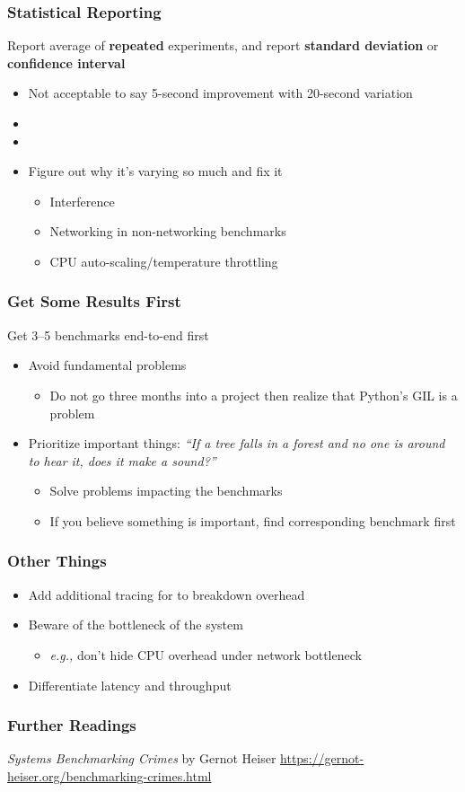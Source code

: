 \documentclass[xcolor={dvipsnames},aspectratio=149]{beamer}
\def\eg{\emph{e.g.,}\xspace}
\begin{document}
\begin{frame}
  \frametitle{Statistical Reporting}
  Report average of \textbf{repeated} experiments, and report \textbf{standard deviation} or
  \textbf{confidence interval}
  \begin{itemize}
  \item Not acceptable to say 5-second improvement with 20-second variation
  \item {} 
  \item {} 
  \item<6> Figure out why it's varying so much and fix it
    \begin{itemize}
    \item Interference
    \item Networking in non-networking benchmarks
    \item CPU auto-scaling/temperature throttling
    \end{itemize}
  \end{itemize}
\end{frame}

\begin{frame}
  \frametitle{Get Some Results First}
  Get 3--5 benchmarks end-to-end first
  \begin{itemize}
  \item Avoid fundamental problems
    \begin{itemize}
    \item Do not go three months into a project then realize that Python's GIL is a problem
    \end{itemize}
  \item Prioritize important things: \textit{``If a tree falls in a forest and no one is around to hear it, does it make a sound?''}

    \begin{itemize}
    \item Solve problems impacting the benchmarks
    \item If you believe something is important, find corresponding benchmark first
    \end{itemize}
  \end{itemize}
\end{frame}

\begin{frame}
  \frametitle{Other Things}
  \begin{itemize}
  \item Add additional tracing for to breakdown overhead
  \item Beware of the bottleneck of the system
    \begin{itemize}
    \item \eg don't hide CPU overhead under network bottleneck
    \end{itemize}
  \item Differentiate latency and throughput
  \end{itemize}
\end{frame}

\begin{frame}
  \frametitle{Further Readings}
    \textit{Systems Benchmarking Crimes} by Gernot Heiser \url{https://gernot-heiser.org/benchmarking-crimes.html}
\end{frame}
\end{document}
